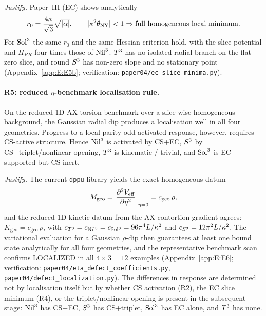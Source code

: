 \textit{Justify.}  Paper~III (EC) \cite{paper3ec} shows analytically
\begin{equation}
  r_0 = \frac{4\kappa}{\sqrt{3}}\sqrt{|\alpha|},
  \qquad
  |\kappa^2 \theta_{\mathrm{NY}}| < 1 \Rightarrow \text{full homogeneous local minimum}.
\end{equation}
For $\mathrm{Sol}^3$ the same $r_0$ and the same Hessian criterion hold, with the
slice potential and $H_{RR}$ four times those of $\mathrm{Nil}^3$.  $T^3$ has
no isolated radial branch on the flat zero slice, and round $S^3$ has
non-zero slope and no stationary point (Appendix~\ref{app:E:E5b};
verification: \texttt{paper04/ec\_slice\_minima.py}).

\paragraph{R5: reduced $\eta$-benchmark localisation rule.}
On the reduced 1D AX-torsion benchmark over a slice-wise homogeneous
background, the Gaussian radial dip produces a localisation well in all four
geometries.  Progress to a local parity-odd activated response, however,
requires CS-active structure.  Hence $\mathrm{Nil}^3$ is activated by CS+EC,
$S^3$ by CS+triplet/nonlinear opening, $T^3$ is kinematic / trivial,
and $\mathrm{Sol}^3$ is EC-supported but CS-inert.

\textit{Justify.}  The current \texttt{dppu} library yields the exact
homogeneous datum
\begin{equation}
  M_{\mathrm{geo}} = \left.\frac{\partial^2 V_{\mathrm{eff}}}{\partial \eta^2}\right|_{\eta=0}
  = c_{\mathrm{geo}}\,\rho,
\end{equation}
and the reduced 1D kinetic datum from the AX contortion gradient agrees:
$K_{\mathrm{geo}} = c_{\mathrm{geo}}\,\rho$, with
$c_{T^3} = c_{\mathrm{Nil}^3} = c_{\mathrm{Sol}^3} = 96\pi^4 L/\kappa^2$ and
$c_{S^3} = 12\pi^2 L/\kappa^2$.  The variational evaluation for a
Gaussian $\rho$-dip then guarantees at least one bound state analytically
for all four geometries, and the representative benchmark scan confirms
LOCALIZED in all $4 \times 3 = 12$ examples
(Appendix~\ref{app:E:E6}; verification:
\texttt{paper04/eta\_defect\_coefficients.py},
\texttt{paper04/defect\_localization.py}).
The differences in response are determined not by localisation itself but by
whether CS activation (R2), the EC slice minimum (R4), or the
triplet/nonlinear opening is present in the subsequent stage: $\mathrm{Nil}^3$
has CS+EC, $S^3$ has CS+triplet, $\mathrm{Sol}^3$ has EC alone, and $T^3$
has none.

